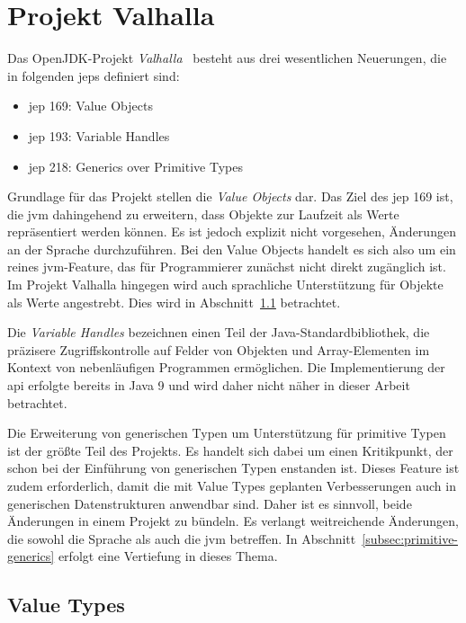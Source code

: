 \section{Projekt Valhalla}\label{sec:valhalla}

Das OpenJDK-Projekt \emph{Valhalla}~\cite{openjdk-valhalla} besteht aus drei wesentlichen Neuerungen, die in folgenden \acp{jep} definiert sind:

\begin{itemize}
    \itemsep0em
    \item \ac{jep} 169: Value Objects~\cite{jep-169}
    \item \ac{jep} 193: Variable Handles~\cite{jep-193}
    \item \ac{jep} 218: Generics over Primitive Types~\cite{jep-218}
\end{itemize}

Grundlage für das Projekt stellen die \emph{Value Objects} dar.
Das Ziel des \ac{jep} 169 ist, die \ac{jvm} dahingehend zu erweitern, dass Objekte zur Laufzeit als Werte repräsentiert werden können.
Es ist jedoch explizit nicht vorgesehen, Änderungen an der Sprache durchzuführen.
Bei den Value Objects handelt es sich also um ein reines \ac{jvm}-Feature, das für Programmierer zunächst nicht direkt zugänglich ist.
Im Projekt Valhalla hingegen wird auch sprachliche Unterstützung für Objekte als Werte angestrebt.
Dies wird in Abschnitt~\ref{subsec:value-types} betrachtet.

Die \emph{Variable Handles} bezeichnen einen Teil der Java-Standardbibliothek, die präzisere Zugriffskontrolle auf Felder von Objekten und Array-Elementen im Kontext von nebenläufigen Programmen ermöglichen.
Die Implementierung der \ac{api} erfolgte bereits in Java 9 und wird daher nicht näher in dieser Arbeit betrachtet.

Die Erweiterung von generischen Typen um Unterstützung für primitive Typen ist der größte Teil des Projekts.
Es handelt sich dabei um einen Kritikpunkt, der schon bei der Einführung von generischen Typen enstanden ist.
Dieses Feature ist zudem erforderlich, damit die mit Value Types geplanten Verbesserungen auch in generischen Datenstrukturen anwendbar sind.
Daher ist es sinnvoll, beide Änderungen in einem Projekt zu bündeln.
Es verlangt weitreichende Änderungen, die sowohl die Sprache als auch die \ac{jvm} betreffen.
In Abschnitt~\ref{subsec:primitive-generics} erfolgt eine Vertiefung in dieses Thema.

\subsection{Value Types}\label{subsec:value-types}


